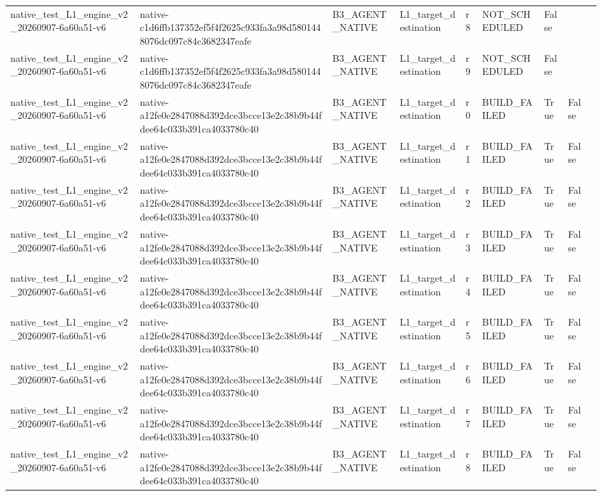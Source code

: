 \begin{tabular}{lllllllll}
native\_test\_L1\_engine\_v2\_20260907-6a60a51-v6 & native-c1d6ffb137352ef5f4f2625c933fa3a98d5801448076dc097c84c3682347eafe & B3\_AGENT\_NATIVE & L1\_target\_destination & r8 & NOT\_SCHEDULED & False &  &  \\
native\_test\_L1\_engine\_v2\_20260907-6a60a51-v6 & native-c1d6ffb137352ef5f4f2625c933fa3a98d5801448076dc097c84c3682347eafe & B3\_AGENT\_NATIVE & L1\_target\_destination & r9 & NOT\_SCHEDULED & False &  &  \\
native\_test\_L1\_engine\_v2\_20260907-6a60a51-v6 & native-a12fe0e2847088d392dce3bcce13e2c38b9b44fdee64c033b391ca4033780c40 & B3\_AGENT\_NATIVE & L1\_target\_destination & r0 & BUILD\_FAILED & True & False &  \\
native\_test\_L1\_engine\_v2\_20260907-6a60a51-v6 & native-a12fe0e2847088d392dce3bcce13e2c38b9b44fdee64c033b391ca4033780c40 & B3\_AGENT\_NATIVE & L1\_target\_destination & r1 & BUILD\_FAILED & True & False &  \\
native\_test\_L1\_engine\_v2\_20260907-6a60a51-v6 & native-a12fe0e2847088d392dce3bcce13e2c38b9b44fdee64c033b391ca4033780c40 & B3\_AGENT\_NATIVE & L1\_target\_destination & r2 & BUILD\_FAILED & True & False &  \\
native\_test\_L1\_engine\_v2\_20260907-6a60a51-v6 & native-a12fe0e2847088d392dce3bcce13e2c38b9b44fdee64c033b391ca4033780c40 & B3\_AGENT\_NATIVE & L1\_target\_destination & r3 & BUILD\_FAILED & True & False &  \\
native\_test\_L1\_engine\_v2\_20260907-6a60a51-v6 & native-a12fe0e2847088d392dce3bcce13e2c38b9b44fdee64c033b391ca4033780c40 & B3\_AGENT\_NATIVE & L1\_target\_destination & r4 & BUILD\_FAILED & True & False &  \\
native\_test\_L1\_engine\_v2\_20260907-6a60a51-v6 & native-a12fe0e2847088d392dce3bcce13e2c38b9b44fdee64c033b391ca4033780c40 & B3\_AGENT\_NATIVE & L1\_target\_destination & r5 & BUILD\_FAILED & True & False &  \\
native\_test\_L1\_engine\_v2\_20260907-6a60a51-v6 & native-a12fe0e2847088d392dce3bcce13e2c38b9b44fdee64c033b391ca4033780c40 & B3\_AGENT\_NATIVE & L1\_target\_destination & r6 & BUILD\_FAILED & True & False &  \\
native\_test\_L1\_engine\_v2\_20260907-6a60a51-v6 & native-a12fe0e2847088d392dce3bcce13e2c38b9b44fdee64c033b391ca4033780c40 & B3\_AGENT\_NATIVE & L1\_target\_destination & r7 & BUILD\_FAILED & True & False &  \\
native\_test\_L1\_engine\_v2\_20260907-6a60a51-v6 & native-a12fe0e2847088d392dce3bcce13e2c38b9b44fdee64c033b391ca4033780c40 & B3\_AGENT\_NATIVE & L1\_target\_destination & r8 & BUILD\_FAILED & True & False &  \\

\end{tabular}
